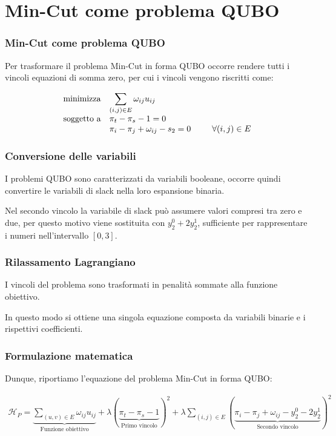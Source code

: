 \documentclass[10pt]{beamer}
\begin{document}
\section[Da CSP a QUBO]{Min-Cut come problema QUBO}
\begin{frame}
  \frametitle{Min-Cut come problema QUBO}

  Per trasformare il problema Min-Cut in forma QUBO occorre rendere tutti i vincoli equazioni di somma zero, per cui i vincoli vengono riscritti come:

  \begin{equation*}
    \begin{array}{ll@{}ll}
    \text{minimizza}    & \displaystyle\sum_{(i, j) \in E} \omega_{ij}u_{ij}&\\
    \text{soggetto a}   & \displaystyle \pi_t - \pi_s - 1 = 0 &\\
                        & \displaystyle \pi_i - \pi_j  + \omega_{ij} - s_2 = 0\;\;\;\;\;\;\;\;\; & \forall (i,j) \in E\\
    \end{array}
\end{equation*}

\end{frame}
\begin{frame}
  \frametitle{Conversione delle variabili}

  I problemi QUBO sono caratterizzati da variabili booleane, occorre quindi convertire le variabili di slack nella loro espansione binaria.

  Nel secondo vincolo la variabile di slack può assumere valori compresi tra zero e due, per questo motivo viene sostituita con $y_2^0 + 2y_2^1$, sufficiente per rappresentare i numeri nell'intervallo $[0, 3]$.

\end{frame}
\begin{frame}
  \frametitle{Rilassamento Lagrangiano}

  I vincoli del problema sono trasformati in penalità sommate alla funzione obiettivo.

  In questo modo si ottiene una singola equazione composta da variabili binarie e i rispettivi coefficienti.

\end{frame}
\begin{frame}
  \frametitle{Formulazione matematica}

  Dunque, riportiamo l'equazione del problema Min-Cut in forma QUBO:

  \begin{center}
    \begin{multline*}
      \mathcal{H}_P = \underbrace{\sum_{(u, v) \in E} \omega_{ij}u_{ij}}_{\text{Funzione obiettivo}} + \lambda(\underbrace{\pi_t - \pi_s - 1}_{\text{Primo vincolo}})^2 + \lambda\sum_{(i, j) \in E}(\underbrace{\pi_i - \pi_j + \omega_{ij} - y_2^0 - 2y_2^1}_{\text{Secondo vincolo}})^2
    \end{multline*}    
\end{center}

\end{frame}
\end{document}
